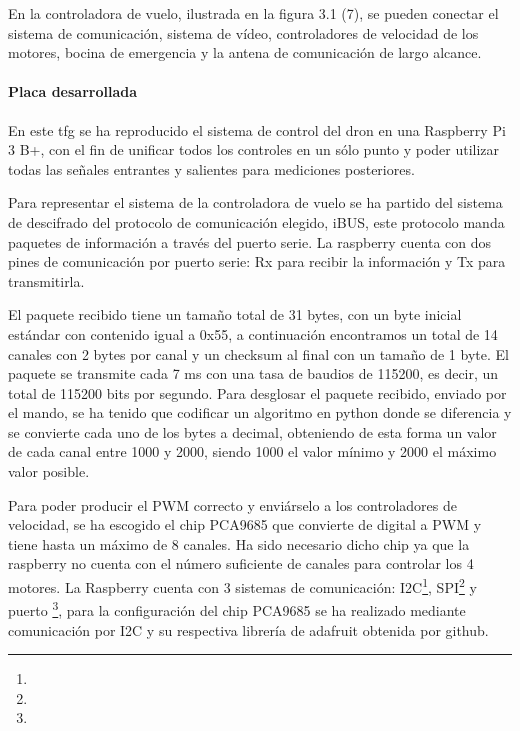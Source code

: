 
	En la controladora de vuelo, ilustrada en la figura 3.1 (7), se pueden conectar el sistema de comunicación, sistema de vídeo, controladores de velocidad de los motores, bocina de emergencia y la antena de comunicación de largo alcance.


\paragraph{Placa desarrollada}
\label{SSSS:Placa desarrollada}
En este \ac{tfg} se ha reproducido el sistema de control del dron en una Raspberry Pi 3 B+\cite{raspberryPi}, con el fin de unificar todos los controles en un sólo punto y poder utilizar todas las señales entrantes y salientes para mediciones posteriores.

Para representar el sistema de la controladora de vuelo se ha partido del sistema de descifrado del protocolo de comunicación elegido, iBUS, este protocolo manda paquetes de información a través del puerto serie. La raspberry cuenta con dos pines de comunicación por puerto serie: Rx para recibir la información y Tx para transmitirla.
	
El paquete recibido tiene un tamaño total de 31 bytes, con un byte inicial estándar con contenido igual a 0x55, a continuación encontramos un total de 14 canales con 2 bytes por canal y un checksum al final con un tamaño de 1 byte. El paquete se transmite cada 7 ms con una tasa de baudios de 115200, es decir, un total de 115200 bits por segundo.
Para desglosar el paquete recibido, enviado por el mando, se ha tenido que codificar un algoritmo en python donde se diferencia y se convierte cada uno de los bytes a decimal, obteniendo de esta forma un valor de cada canal entre 1000 y 2000, siendo 1000 el valor mínimo y 2000 el máximo valor posible.

Para poder producir el PWM correcto y enviárselo a los controladores de velocidad, se ha escogido el chip PCA9685 que convierte de digital a PWM y tiene hasta un máximo de 8 canales. Ha sido necesario dicho chip ya que la raspberry no cuenta con el número suficiente de canales para controlar los 4 motores.
La Raspberry cuenta con 3 sistemas de comunicación: I2C\footnote{}, SPI\footnote{} y puerto \footnote{}, para la configuración del chip PCA9685 se ha realizado mediante comunicación por I2C y su respectiva librería de adafruit obtenida por github\cite{Industries}. 

